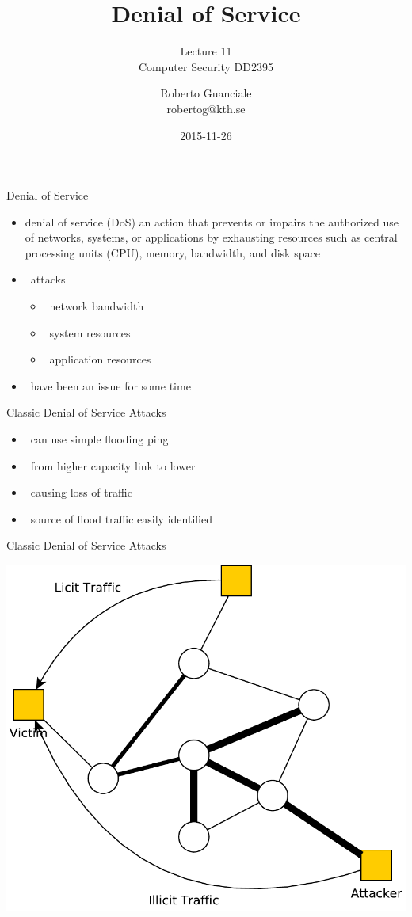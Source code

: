 \documentclass{beamer}
\title{Denial of Service}
\subtitle{Lecture 11 \\ Computer Security DD2395}
\author[R. Guanciale]{
  Roberto Guanciale\\
  robertog@kth.se
}
\date{2015-11-26}
\begin{document}
\begin{frame}[plain]
  \titlepage
\end{frame}

\begin{frame}{Denial of Service}
  \begin{itemize}
  \item denial of service (DoS) an action that prevents or 
    impairs the authorized use of networks, systems, or 
    applications by exhausting resources such as central 
    processing units (CPU), memory, bandwidth, and 
    disk space 
  \item  attacks 
  \begin{itemize}
    \item  network bandwidth 
    \item  system resources 
    \item  application resources 
  \end{itemize}
  \item  have been an issue for some time
  \end{itemize}
\end{frame}

\begin{frame}{Classic Denial of Service Attacks}
  \begin{itemize}
  \item  can use simple flooding ping 
  \item  from higher capacity link to lower 
  \item  causing loss of traffic 
  \item  source of flood traffic easily identified
  \end{itemize}
\end{frame}

\begin{frame}{Classic Denial of Service Attacks}
  \begin{center}
    \includegraphics[width=0.8\linewidth]{dos1}
  \end{center}
\end{frame}
\end{document}
